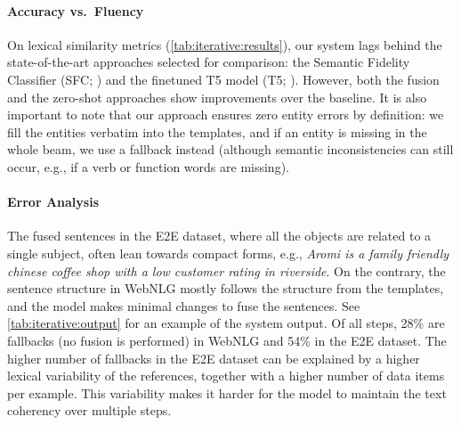 \paragraph{Accuracy vs.\ Fluency}
On lexical similarity metrics (\autoref{tab:iterative:results}), our system lags behind the state-of-the-art approaches selected for comparison: the Semantic Fidelity Classifier (SFC; \citealp{harkousHaveYourText2020}) and the finetuned T5 model (T5; \citealp{kaleTexttoTextPreTrainingDatatoText2020}). However, both the fusion and the zero-shot approaches show improvements over the baseline. It is also important to note that our approach ensures zero entity errors by definition: we fill the entities verbatim into the templates, and if an entity is missing in the whole beam, we use a fallback instead (although semantic inconsistencies can still occur, e.g., if a verb or function words are missing).

\paragraph{Error Analysis} The fused sentences in the E2E dataset, where all the objects are related to a single subject, often lean towards compact forms, e.g., \textit{Aromi is a family friendly chinese coffee shop with a low customer rating in riverside}. On the contrary, the sentence structure in WebNLG mostly follows the structure from the templates, and the model makes minimal changes to fuse the sentences. See \autoref{tab:iterative:output} for an example of the system output. Of all steps, 28\% are fallbacks (no fusion is performed) in WebNLG and 54\% in the E2E dataset.
The higher number of fallbacks in the E2E dataset can be explained by a higher lexical variability of the references, together with a higher number of data items per example. This variability makes it harder for the model to maintain the text coherency over multiple steps.


